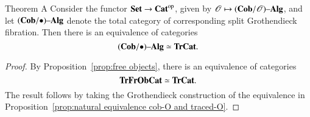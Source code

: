 \documentclass[12pt,oneside,article,draft]{memoir}
\begin{document}
%
%
%
\begin{named}{Theorem A}\label{thm:Theorem A}
	Consider the functor $\mathbf{Set}\to{\mathbf{Cat}}^{\text{op}}$, given by $\mathscr{O}\mapsto(\mathbf{Cob}/\mathscr{O}){\text \textendash}\mathbf{Alg}$, and let $(\mathbf{Cob}/\bullet){\text \textendash}\mathbf{Alg}$ denote the total category of corresponding split Grothendieck fibration.
	Then there is an equivalence of categories
		$$(\mathbf{Cob}/\bullet){\text \textendash}\mathbf{Alg}\simeq\mathbf{TrCat}.$$
\end{named}
\begin{proof}
	By Proposition~\ref{prop:free objects}, there is an equivalence of categories 
		$$\mathbf{TrFrObCat}\simeq\mathbf{TrCat}.$$ 
	The result follows by taking the Grothendieck construction of the equivalence in Proposition~\ref{prop:natural equivalence cob-O and traced-O}.
\end{proof}
\end{document}
